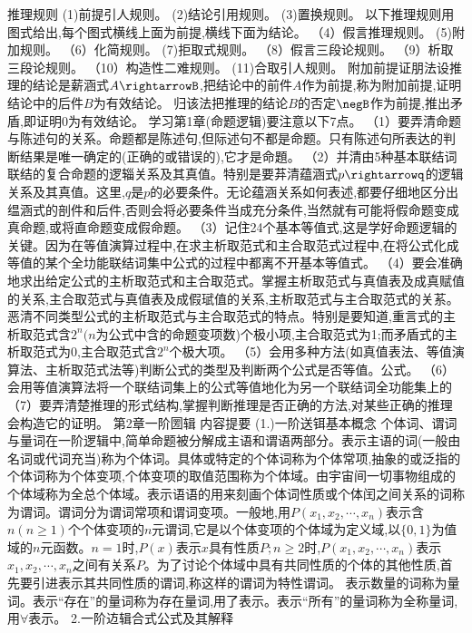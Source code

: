 推理规则
(1)前提引人规则。
(2)结论引用规则。
(3)置换规则。
以下推理规则用图式给出,每个图式横线上面为前提,横线下面为结论。
（4）假言推理规则。
(5)附加规则。
（6）化简规则。
(7)拒取式规则。
（8）假言三段论规则。
（9）析取三段论规则。
（10）构造性二难规则。
(11)合取引人规则。
附加前提证朋法设推理的结论是薪涵式$A\rightarrowB$,把结论中的前件$A$作为前提,称为附加前提,证明结论中的后件$B$为有效结论。
归该法把推理的结论$B$的否定$\negB$作为前提,推出矛盾,即证明0为有效结论。
学习第1章(命题逻辑)要注意以下7点。
（1）要弄清命题与陈述句的关系。命题都是陈述句,但际述句不都是命题。只有陈述句所表达的判断结果是唯一确定的(正确的或错误的),它才是命題。
（2）并清由5种基本联结词联结的复合命题的逻辎关系及其真值。特别是要䒪清蕴涵式$p\rightarrowq$的逻辑关系及其真值。这里,$q$是$p$的必要条件。无论蕴涵关系如何表述,都要仔细地区分出缊涵式的剖件和后件,否则会将必要条件当成充分条件,当然就有可能将假命题变成真命题,或将直命题变成假命题。
（3）记住24个基本等值式,这是学好命题逻辑的关键。因为在等值演算过程中,在求主析取范式和主合取范式过程中,在将公式化成等值的某个全㘦能联结词集中公式的过程中都离不开基本等值式。
（4）要会准确地求出给定公式的主析取范式和主合取范式。掌握主析取范式与真值表及成真赋值的关系,主合取范式与真值表及成假珷值的关系,主析取范式与主合取范式的关䒺。恶清不同类型公式的主析取范式与主合取范式的特点。特别是要知道,重言式的主析取范式含$2^{n}(n$为公式中含的命题变项数)个极小项,主合取范式为1;而矛盾式的主析取范式为0,主合取范式含$2^{n}$个极大项。
（5）会用多种方法(如真值表法、等值演算法、主析取范式法等)判断公式的类型及判断两个公式是否等值。公式。
（6）会用等值演算法将一个联结词集上的公式等值地化为另一个联结词全功能集上的
（7）要弄清楚推理的形式结构,掌握判断推理是否正确的方法,对某些正确的推理会构造它的证明。
{第2章一阶圐辑}
{内容提要}
{(1.)一阶送铒基本概念}
个体词、谓词与量词在一阶逻辑中,简单命题被分解成主语和谓语两部分。表示主语的词(一般由名词或代词充当)称为个体词。具体或特定的个体词称为个体常项,抽象的或泛指的个体词称为个体变项,个体变项的取值范围称为个体域。由宇宙间一切事物组成的个体域称为全总个体域。表示语语的用来刻画个体词性质或个体闰之间关系的词称为谓词。谓词分为谓词常项和谓词变项。一般地,用$P\left(x_{1},x_{2},\cdots,x_{n}\right)$表示含$n(n\geqslant1)$个个体变项的$n$元谓词,它是以个体变项的个体域为定义域,以$\{0,1\}$为值域的$n$元函数。$n=1$时,$P(x)$表示$x$具有性质$P;n\geqslant2$时,$P\left(x_{1},x_{2},\cdots,x_{n}\right)$表示$x_{1},x_{2},\cdots,x_{n}$之间有关系$P$。为了讨论个体域中具有共同性质的个体的其他性质,首先要引进表示其共同性质的谓词,称这样的谓词为特性谓词。
表示数量的词称为量词。表示“存在”的量词称为存在量词,用了表示。表示“所有”的量词称为全称量词,用$\forall$表示。
{2.一阶䢍辑合式公式及其解释}
